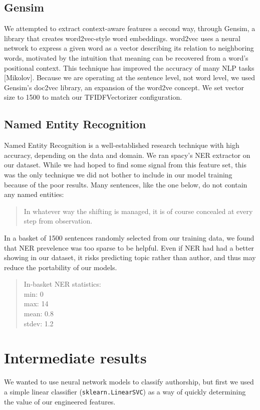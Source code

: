 \documentclass[12pt]{article}
\begin{document}
\subsection{Gensim}
We attempted to extract context-aware features a second way, through Gensim, a library that creates word2vec-style word embeddings. word2vec uses a neural network to express a given word as a vector describing its relation to neighboring words, motivated by the intuition that meaning can be recovered from a word's positional context. This technique has improved the accuracy of many NLP tasks [Mikolov]. Because we are operating at the sentence level, not word level, we used Gensim's doc2vec library, an expansion of the word2ve concept. We set vector size to 1500 to match our TFIDFVectorizer configuration.

\subsection{Named Entity Recognition}
Named Entity Recognition is a well-established research technique with high accuracy, depending on the data and domain. We ran spacy's NER extractor on our dataset. While we had hoped to find some signal from this feature set, this was the only technique we did not bother to include in our model training because of the poor results. Many sentences, like the one below, do not contain any named entities:

\begin{quote}
In whatever way the shifting is managed, it is of course concealed at every step from observation.
\end{quote}

In a basket of 1500 sentences randomly selected from our training data, we found that NER prevelence was too sparse to be helpful. Even if NER had had a better showing in our dataset, it risks predicting topic rather than author, and thus may reduce the portability of our models.

\begin{quote}
In-basket NER statistics:\\
min: 0 \\
max: 14 \\
mean: 0.8 \\
stdev: 1.2\\
\end{quote}


\section{Intermediate results}
We wanted to use neural network models to classify authorship, but first we used a simple linear classifier (\texttt{sklearn.LinearSVC}) as a way of quickly determining the value of our engineered features.
\end{document}
